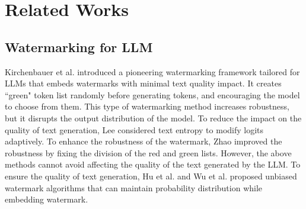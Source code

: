 \section{Related Works}
\subsection{Watermarking for LLM}

Kirchenbauer et al.\cite{kirchenbauer23a} introduced a pioneering watermarking framework tailored for LLMs that embeds watermarks with minimal text quality impact. It creates ``green" token list randomly before generating tokens, and encouraging the model to choose from them. This type of watermarking method increases robustness, but it disrupts the output distribution of the model\cite{singh2023newevaluationmetricscapture}. To reduce the impact on the quality of text generation, Lee\cite{lee2024wrote} considered text entropy to modify logits adaptively. To enhance the robustness of the watermark, Zhao\cite{zhao2024provable} improved the robustness by fixing the division of the red and green lists. However, the above methods cannot avoid affecting the quality of the text generated by the LLM. To ensure the quality of text generation, Hu et al.\cite{hu2024unbiased} and Wu et al.\cite{wu2024dip} proposed unbiased watermark algorithms that can maintain probability distribution while embedding watermark.
